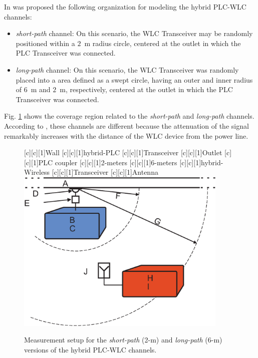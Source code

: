 In \cite{thiago:hyb} was proposed the following organization for modeling the hybrid \ac{PLC}-\ac{WLC} channels:
    
\begin{itemize}
\item \textit{short-path} channel: On this scenario, the \ac{WLC} Transceiver may be randomly positioned within a $2$~m radius circle, centered at the outlet in which the \ac{PLC} Transceiver was connected.

\item \textit{long-path} channel: On this scenario, the \ac{WLC} Transceiver was randomly placed into a area defined as a swept circle, having an outer and inner radius of $6$~m and $2$~m, respectively, centered at the outlet in which the \ac{PLC} Transceiver was connected.
\end{itemize}
    
Fig. \ref{hybSL} shows the coverage region related to the \textit{short-path} and \textit{long-path} channels. According to \cite{thiago:hyb,thiago:hyb2,thiago:doc}, these channels are different because the attenuation of the signal remarkably increases with the distance of the \ac{WLC} device from the power line. 

\begin{figure}[h]
	\centering
	[c][1]{Wall}
	[c][1]{hybrid-PLC}
	[c][1]{Transceiver}
	[c][1]{Outlet}
	[c][1]{PLC coupler}
	[c][1]{2-meters}
	[c][1]{6-meters}
	[c][1]{hybrid-Wireless}
	[c][1]{Transceiver}
	[c][1]{Antenna}
	\includegraphics[width=0.9\textwidth]{images/Hybrid_LandS_channel.eps}
	\caption{Measurement setup for the \textit{short-path} (2-m) and \textit{long-path} (6-m) versions of the hybrid PLC-WLC channels.}
	\label{hybSL}
\end{figure}

